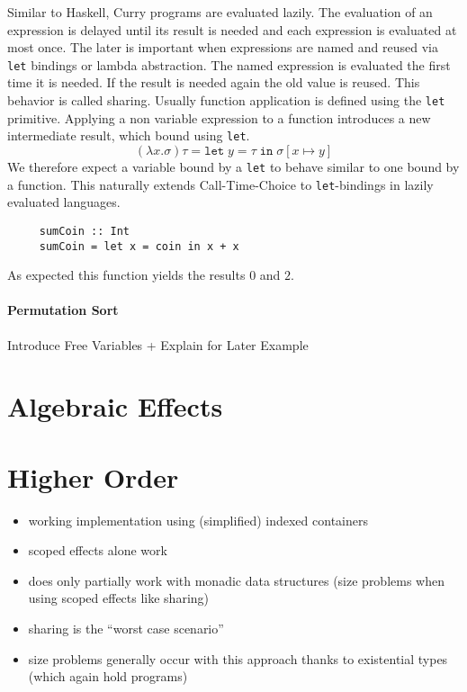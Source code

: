 \documentclass[10pt,a4paper,twoside]{report}
\begin{document}
Similar to Haskell, Curry programs are evaluated lazily.
The evaluation of an expression is delayed until its result is needed and each
expression is evaluated at most once.
The later is important when expressions are named and reused via \texttt{let}
bindings or lambda abstraction.
The named expression is evaluated the first time it is needed.
If the result is needed again the old value is reused.
This behavior is called sharing.
Usually function application is defined using the \texttt{let} primitive.
Applying a non variable expression to a function introduces a new intermediate
result, which bound using \texttt{let}.
$$
(\lambda x.\sigma) \tau = \texttt{let}\;y = \tau\;\texttt{in}\;\sigma[x\mapsto y]
$$
We therefore expect a variable bound by a \texttt{let} to behave similar to one
bound by a function.
This naturally extends Call-Time-Choice to \texttt{let}-bindings in lazily
evaluated languages.

\begin{verbatim}
     sumCoin :: Int
     sumCoin = let x = coin in x + x
\end{verbatim}
As expected this function yields the results $0$ and $2$.

\subsubsection{Permutation Sort}

Introduce Free Variables + Explain for Later Example


\chapter{Algebraic Effects}


\chapter{Higher Order}
\begin{itemize}
  \item working implementation using (simplified) indexed containers
  \item scoped effects alone work
  \item does only partially work with monadic data structures (size problems
    when using scoped effects like sharing)
  \item sharing is the ``worst case scenario''
  \item size problems generally occur with this approach thanks to existential
    types (which again hold programs)
\end{itemize}
\end{document}
